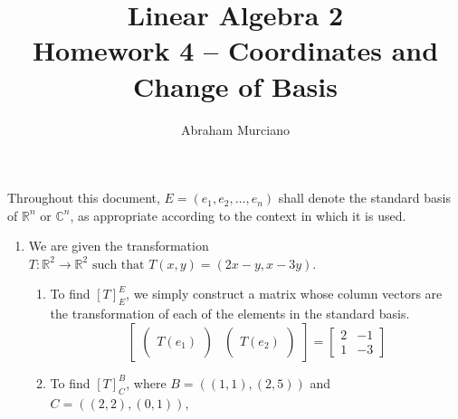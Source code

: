\documentclass{article}
\title{Linear Algebra 2 \\
\medskip
\large Homework 4 -- Coordinates and Change of Basis}
\author{Abraham Murciano}
\newenvironment{answers}{ %
	\begin{enumerate}
		\setlength{\itemsep}{\bigskipamount}
}{\end{enumerate}}
\newcommand{\R}{\mathbb{R}}
\newcommand{\C}{\mathbb{C}}
\newcommand{\st}{\text{ such that }}
\begin{document}
\maketitle

Throughout this document, \(E = (e_1, e_2, \dots, e_n)\) shall denote the standard basis of \(\R^n\) or \(\C^n\), as appropriate according to the context in which it is used.

\begin{answers}

	\item
	We are given the transformation \(T : \R^2 \to \R^2 \st T(x,y) = (2x-y, x-3y)\).

	\begin{enumerate}
		\item
		      To find \([T]^E_E\), we simply construct a matrix whose column vectors are the transformation of each of the elements in the standard basis.
		      \begin{equation*}
			      \left[ \begin{matrix}
					      \left( \begin{matrix}
						      \\ T(e_1) \\ {}
					      \end{matrix} \right) &
					      \left( \begin{matrix}
						      \\ T(e_2) \\ {}
					      \end{matrix} \right)
				      \end{matrix} \right]
			      = \left[ \begin{matrix}
					      2 & -1 \\
					      1 & -3
				      \end{matrix} \right]
		      \end{equation*}
		\item
		      To find \([T]^B_C\), where \(B = ((1,1), (2,5))\) and \(C=((2,2), (0,1))\),
	\end{enumerate}

\end{answers}
\end{document}
